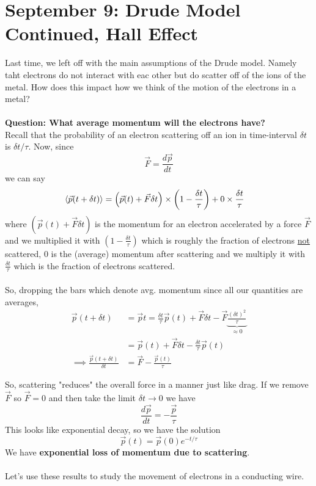 \documentclass[11pt]{article}
\begin{document}
\pagebreak
\section{September 9: Drude Model Continued, Hall Effect}

Last time, we left off with the main assumptions of the Drude model. Namely taht electrons do not interact with eac other but do scatter off of the ions of the metal. How does this impact how we think of the motion of the electrons in a metal?
\\
\\
\textbf{Question: What average momentum will the electrons have?}
\\
Recall that the probability of an electron scattering off an ion in time-interval $\delta t$ is $\delta t / \tau$. Now, since \[ \vec{F} = \frac{d\vec{p}}{dt}  \] we can say
\begin{align*}
  \langle \vec{p}(t + \delta t) \rangle &= \left(\vec{p}(t) + \vec{F} \delta t\right) \times \left( 1 - \frac{\delta t}{\tau} \right) + 0 \times \frac{\delta t}{\tau}
\end{align*}
where $\left(\vec{p}(t) + \vec{F} \delta t\right)$ is the momentum for an electron accelerated by a force $\vec{F}$ and we multiplied it with $\left(1 - \frac{\delta t}{\tau}\right)$ which is roughly the fraction of electrons \underline{not} scattered, $0$ is the (average) momentum after scattering and we multiply it with $\frac{\delta t}{\tau}$ which is the fraction of electrons scattered. 
\\
\\
So, dropping the bars which denote avg. momentum since all our quantities are averages,
\begin{align*}
  \vec{p}(t + \delta t) &= \vec{p}t = \frac{\delta t}{\tau} \vec{p}(t) + \vec{F}\delta t - \vec{F} \underbrace{\frac{(\delta t)^2}{\tau}}_{\approx 0} \\
  &= \vec{p}(t) + \vec{F} \delta t - \frac{\delta t}{\tau} \vec{p}(t) \\
  \implies \frac{\vec{p}(t + \delta t)}{\delta t} &= \vec{F} - \frac{\vec{p}(t)}{\tau} 
\end{align*}

So, scattering "reduces" the overall force in a manner just like drag. If we remove $\vec{F}$ so $\vec{F} = 0$ and then take the limit $\delta t \rightarrow 0$ we have \[  \frac{d\vec{p}}{dt} = -\frac{\vec{p}}{\tau}  \] This looks like exponential decay, so we have the solution \[ \boxed{\vec{p}(t) = \vec{p}(0) e^{-t / \tau} } \] We have \textbf{exponential loss of momentum due to scattering}.
\\
\\
Let's use these results to study the movement of electrons in a conducting wire.
\end{document}
